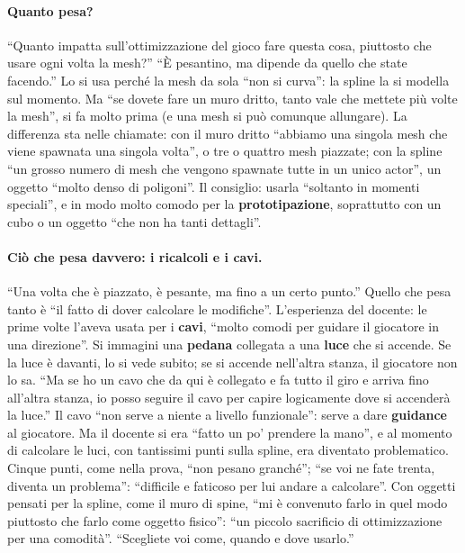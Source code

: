 \paragraph{Quanto pesa?} ``Quanto impatta sull'ottimizzazione del gioco fare questa cosa,
piuttosto che usare ogni volta la mesh?'' ``È pesantino, ma dipende da quello che state
facendo.'' Lo si usa perché la mesh da sola ``non si curva'': la spline la si modella sul
momento. Ma ``se dovete fare un muro dritto, tanto vale che mettete più volte la mesh'', si fa
molto prima (e una mesh si può comunque allungare). La differenza sta nelle chiamate: con il
muro dritto ``abbiamo una singola mesh che viene spawnata una singola volta'', o tre o quattro
mesh piazzate; con la spline ``un grosso numero di mesh che vengono spawnate tutte in un unico
actor'', un oggetto ``molto denso di poligoni''. Il consiglio: usarla ``soltanto in momenti
speciali'', e in modo molto comodo per la \textbf{prototipazione}, soprattutto con un cubo o un
oggetto ``che non ha tanti dettagli''.

\paragraph{Ciò che pesa davvero: i ricalcoli e i cavi.} ``Una volta che è piazzato, è pesante,
ma fino a un certo punto.'' Quello che pesa tanto è ``il fatto di dover calcolare le
modifiche''. L'esperienza del docente: le prime volte l'aveva usata per i \textbf{cavi}, ``molto
comodi per guidare il giocatore in una direzione''. Si immagini una \textbf{pedana} collegata a
una \textbf{luce} che si accende. Se la luce è davanti, lo si vede subito; se si accende
nell'altra stanza, il giocatore non lo sa. ``Ma se ho un cavo che da qui è collegato e fa tutto
il giro e arriva fino all'altra stanza, io posso seguire il cavo per capire logicamente dove si
accenderà la luce.'' Il cavo ``non serve a niente a livello funzionale'': serve a dare
\textbf{guidance} al giocatore. Ma il docente si era ``fatto un po' prendere la mano'', e al
momento di calcolare le luci, con tantissimi punti sulla spline, era diventato problematico.
Cinque punti, come nella prova, ``non pesano granché''; ``se voi ne fate trenta, diventa un
problema'': ``difficile e faticoso per lui andare a calcolare''. Con oggetti pensati per la
spline, come il muro di spine, ``mi è convenuto farlo in quel modo piuttosto che farlo come
oggetto fisico'': ``un piccolo sacrificio di ottimizzazione per una comodità''. ``Scegliete voi
come, quando e dove usarlo.''

